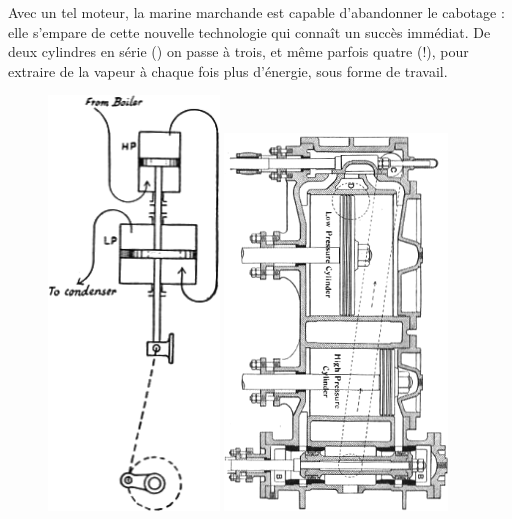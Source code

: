 	Avec un tel moteur, la marine marchande est capable d’abandonner le cabotage : elle s’empare de cette nouvelle technologie qui connaît un succès immédiat. De deux cylindres en série () on passe à trois, et même parfois quatre (!), pour extraire de la vapeur à chaque fois plus d’énergie, sous forme de travail.

	\begin{figure}
		\begin{center}
			\includegraphics[height=11cm, max height=0.55\textheight]{images/ripper_compound_1.png}
			\includegraphics[height=10cm, max height=0.55\textheight]{images/ripper_compound_2.png}
		\end{center}
	\end{figure}

